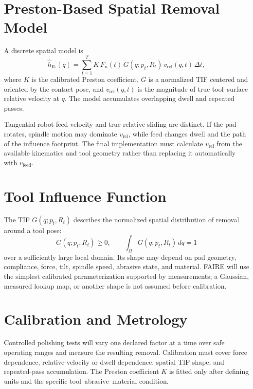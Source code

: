 \section{Preston-Based Spatial Removal Model}
A discrete spatial model is
\begin{equation}
  \hat h_{\mathrm{IL}}(q)
  =
  \sum_{t=1}^{T}
  K\,F_n(t)\,
  G(q;p_t,R_t)\,
  v_{\mathrm{rel}}(q,t)\,\Delta t,
  \label{eq:preston_spatial}
\end{equation}
where \(K\) is the calibrated Preston coefficient, \(G\) is a normalized TIF centered and oriented by the contact pose, and \(v_{\mathrm{rel}}(q,t)\) is the magnitude of true tool--surface relative velocity at \(q\). The model accumulates overlapping dwell and repeated passes.

Tangential robot feed velocity and true relative sliding are distinct. If the pad rotates, spindle motion may dominate \(v_{\mathrm{rel}}\), while feed changes dwell and the path of the influence footprint. The final implementation must calculate \(v_{\mathrm{rel}}\) from the available kinematics and tool geometry rather than replacing it automatically with \(v_{\mathrm{feed}}\).

\section{Tool Influence Function}
The TIF \(G(q;p_t,R_t)\) describes the normalized spatial distribution of removal around a tool pose:
\begin{equation}
  G(q;p_t,R_t)\geq 0,
  \qquad
  \int_{\Omega}G(q;p_t,R_t)\,dq=1
  \label{eq:tif_normalization}
\end{equation}
over a sufficiently large local domain. Its shape may depend on pad geometry, compliance, force, tilt, spindle speed, abrasive state, and material. FAIRE will use the simplest calibrated parameterization supported by measurements; a Gaussian, measured lookup map, or another shape is not assumed before calibration.

\section{Calibration and Metrology}
Controlled polishing tests will vary one declared factor at a time over safe operating ranges and measure the resulting removal. Calibration must cover force dependence, relative-velocity or dwell dependence, spatial TIF shape, and repeated-pass accumulation. The Preston coefficient \(K\) is fitted only after defining units and the specific tool--abrasive--material condition.

